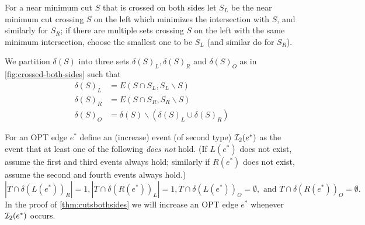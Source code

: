  \begin{definition}\label{def:SLR}
 For a near minimum cut $S$ that is crossed on both sides let $S_L$ be the near minimum cut crossing $S$ on the left which minimizes the intersection with $S$, and similarly for $S_R$; if there are multiple sets crossing $S$ on the left with the same minimum intersection, choose the smallest one to be $S_L$ (and similar do for $S_R$).

We partition $\delta(S)$ into three sets $\delta(S)_L, \delta(S)_R$ and $\delta(S)_O$ as in \cref{fig:crossed-both-sides} such that
 \begin{align*}
 	\delta(S)_L &= E(S \cap S_L, S_L \smallsetminus S) \\
 	 \delta(S)_R &= E(S \cap S_R, S_R \smallsetminus S) \\
 	 \delta(S)_O &= \delta(S) \smallsetminus (\delta(S)_L \cup \delta(S)_R)
 \end{align*}

 \end{definition}
For an OPT edge $e^*$ define an (increase) event (of second type) ${\cal I}_2(e^*)$ as the event that at least one of the following {\em does not} hold. (If $L(e^*)$ does not exist, assume the first and third events always hold; similarly if $R(e^*)$ does not exist, assume the second and fourth events always hold.)
\begin{equation}\label{opt-increase-event}
	|T\cap \delta(L(e^*))_R| = 1, |T\cap \delta(R(e^*))_L| = 1, T\cap \delta(L(e^*))_O = \emptyset, \text{ and }T\cap \delta(R(e^*))_O = \emptyset. %
\end{equation}
In the proof of \cref{thm:cutsbothsides} we will increase an OPT edge $e^*$ whenever ${\cal I}_2(e^*)$ occurs.

